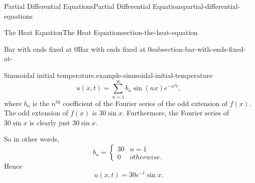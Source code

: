 \documentclass[oneside,10pt,]{book}
\numberwithin{equation}{section}
\renewcommand{\th}{\text{th}}
\newcommand{\amp}{&}
\begin{document}
\begin{chapterptx}{Partial Differential Equations}{}{Partial Differential Equations}{}{}{partial-differential-equations}
\begin{sectionptx}{The Heat Equation}{}{The Heat Equation}{}{}{section-the-heat-equation}
\begin{subsectionptx}{Bar with ends fixed at \(0\)}{}{Bar with ends fixed at \(0\)}{}{}{subsection-bar-with-ends-fixed-at-}
\begin{example}{Sinusoidal initial temperature.}{example-sinusoidal-initial-temperature}
\begin{equation*}
u(x,t) = \sum_{n=1}^{\infty}b_{n}\sin(n x)e^{-n^{2}t},
\end{equation*}
where \(b_{n}\) is the \(n^{\th}\) coefficient of the Fourier series of the odd extension of \(f(x)\). The odd extension of \(f(x)\) is \(30\sin x\). Furthermore, the Fourier series of \(30\sin x\) is clearly just \(30\sin x\).%
\par
\hypertarget{p-698}{}%
So in other words,%
\begin{equation*}
b_{n} = \begin{cases} 30 \amp n=1 \\ 0 \amp otherwise.\end{cases}
\end{equation*}
Hence%
\begin{equation*}
u(x,t) = 30e^{-t}\sin x.
\end{equation*}
%
\end{example}
\end{subsectionptx}
\end{sectionptx}
\end{chapterptx}
%
%
%
%
\typeout{************************************************}
\typeout{************************************************}
%
%
\appendix
%
\end{document}
